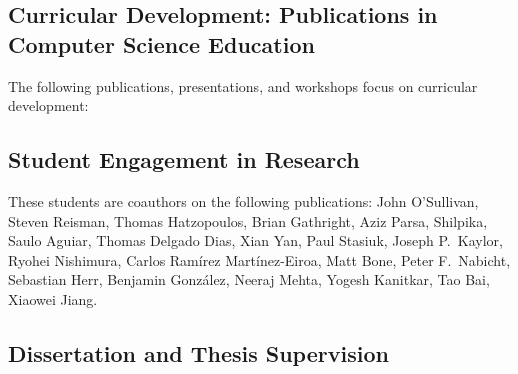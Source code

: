 

\subsection{Curricular Development: Publications in Computer Science Education}

The following publications, presentations, and workshops focus on curricular development:

\begin{refsection}
\nocite{Scala_2019}
\nocite{CDERBook}
\nocite{ScalaDays_2017}
\nocite{wl_honig_framework_2015}
\nocite{mark_lewis_scala_2014}
\nocite{mark_lewis_using_2013}
\nocite{EduPar2012}
\nocite{EduPar2011}
\nocite{2003_AOSD}
\nocite{chung2003}
\nocite{Triveni_OOPSLAEDU_1998}
\nocite{Laufer_MCC_1997}
\printbibliography[heading=none,sorting=ynt]
\end{refsection}
   

\subsection{Student Engagement in Research}

These students are coauthors on the following publications:
John O’Sullivan,
Steven Reisman, 
Thomas Hatzopoulos, 
Brian Gathright, 
Aziz Parsa,
Shilpika, 
Saulo Aguiar,
Thomas Delgado Dias, 
Xian Yan,
Paul Stasiuk,
Joseph P.\ Kaylor,
Ryohei Nishimura, 
Carlos Ramírez Martínez-Eiroa,
Matt Bone, 
Peter F.\ Nabicht,
Sebastian Herr,
Benjamin González,
Neeraj Mehta, 
Yogesh Kanitkar,
Tao Bai,
Xiaowei Jiang.

\begin{refsection}
\nocite{Scala_2019}
\nocite{doi:10.4137/EBO.S32757}
\nocite{WSSSPE_2015}
\nocite{GCASR_2015}
\nocite{GCASR_2015}
\nocite{gcasr_2013_environmental_data}
\nocite{gcasr_2013_tablets}
\nocite{kaylor_simplifying_2012}
\nocite{CloudBookRestFS}
\nocite{kaylor_restfs_2011}
\nocite{DBLP:conf/icsoft/2011-2}
\nocite{george_k_thiruvathukal_virtualization_2010}
\nocite{kaylor_online_2010}
\nocite{k_laufer_putting_2009}
\nocite{DBLP:conf/seke/HerrLSTW08}
\nocite{matt_bone_taming_2008}
\nocite{IPDPS_2007}
\nocite{konstantin_laufer_hike_2007}
\nocite{chung2003}
\nocite{DBLP:conf/cp/GuptaJJJL00}
\printbibliography[heading=none,sorting=ynt]
\end{refsection}


\subsection{Dissertation and Thesis Supervision}

